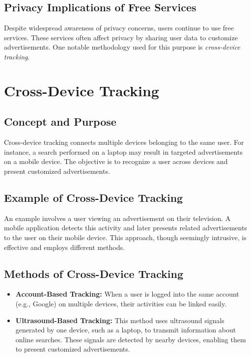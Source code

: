 \documentclass{article}
\begin{document}
\subsection{Privacy Implications of Free Services}
Despite widespread awareness of privacy concerns, users continue to use free services. These services often affect privacy by sharing user data to customize advertisements. One notable methodology used for this purpose is \textit{cross-device tracking}.

\section{Cross-Device Tracking}

\subsection{Concept and Purpose}
Cross-device tracking connects multiple devices belonging to the same user. For instance, a search performed on a laptop may result in targeted advertisements on a mobile device. The objective is to recognize a user across devices and present customized advertisements.

\subsection{Example of Cross-Device Tracking}
An example involves a user viewing an advertisement on their television. A mobile application detects this activity and later presents related advertisements to the user on their mobile device. This approach, though seemingly intrusive, is effective and employs different methods.

\subsection{Methods of Cross-Device Tracking}
\begin{itemize}
    \item \textbf{Account-Based Tracking:} When a user is logged into the same account (e.g., Google) on multiple devices, their activities can be linked easily.
    \item \textbf{Ultrasound-Based Tracking:} This method uses ultrasound signals generated by one device, such as a laptop, to transmit information about online searches. These signals are detected by nearby devices, enabling them to present customized advertisements.
\end{itemize}
\end{document}
